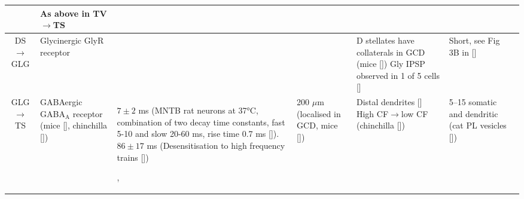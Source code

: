 \begin{longtable}{cYYYYYY}
                                & 
As above in TV\ensuremath{\rightarrow}TS
\\ \midrule
DS\ensuremath{\rightarrow}GLG                                 
                                & 
Glycinergic GlyR receptor                  
                                & %
                                & 
                                & 
D stellates have collaterals in GCD (mice [])
Gly IPSP observed in 1 of 5 cells []    
                                & %
Short, see Fig 3B in []
\\ \midrule
GLG\ensuremath{\rightarrow}TS                         
                                & %
GABAergic GABA$_{\textrm{A}}$ receptor  (mice [], chinchilla [])
                                & %
$7 \pm 2$ ms  (MNTB rat neurons at 37°C, combination of two decay time constants, fast 5-10 and slow 20-60 ms, rise time 0.7 ms []).   $86 \pm 17$ ms (Desensitisation to high frequency trains [])
 
 ,
                                & %
200 $\mu$m (localised in GCD, mice [])
                                & %
Distal dendrites []
High CF\ensuremath{\rightarrow}low CF (chinchilla [])                        
                                & %
5--15 somatic and dendritic (cat PL vesicles [])     


\end{longtable}
